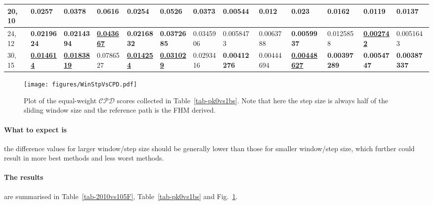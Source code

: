 \begin{table*}
{\begin{tabular}{|l|l|l|l|l|l|l|l|l|l|l|l|l|}
20, 10 & {\color[HTML]{34FF34} \textbf{0.0257}} & 0.0378 & 0.0616 &
  0.0254 & 0.0526 & 0.0373 & 0.00544 & 0.012 &
  0.023 & 0.0162 & {\color[HTML]{34FF34} \textbf{0.0119}} & 0.0137 \\ \hline
24, 12 & {\color[HTML]{32CB00} \textbf{0.0219624}} & {\color[HTML]{32CB00}
  \textbf{0.0214394}} & {\color[HTML]{009901} {\ul \textbf{0.043667}}} &
  {\color[HTML]{32CB00} \textbf{0.0216832}} & {\color[HTML]{32CB00}
  \textbf{0.0372685}} & 0.0345906 & 0.0058473 & 0.0063788 &
  {\color[HTML]{32CB00} \textbf{0.0059937}} & 0.0125858 &
  {\color[HTML]{009901} {\ul \textbf{0.002742}}} & 0.0051643 \\ \hline
30, 15 & {\color[HTML]{009901} {\ul \textbf{0.014614}}} & {\color[HTML]{009901}
  {\ul \textbf{0.0183819}}} & 0.0786527 & {\color[HTML]{009901} {\ul
  \textbf{0.014254}}} & {\color[HTML]{009901} {\ul \textbf{0.031029}}} &
  0.0293416 & {\color[HTML]{34FF34} \textbf{0.00412276}} &
  0.00444694 & {\color[HTML]{009901} {\ul
  \textbf{0.00448627}}} & {\color[HTML]{32CB00} \textbf{0.00397289}} &
  {\color[HTML]{32CB00} \textbf{0.0054747}} & {\color[HTML]{32CB00}
  \textbf{0.00387337}} \\ \hline
\end{tabular}%
}
\end{table*}

\begin{figure}
\centering
\texttt{[image: figures/WinStpVsCPD.pdf]}
\caption[Sliding window and step sizes versus CPD]{Plot of the equal-weight
  $\mathcal{CPD}$ scores collected in Table~\ref{tab-pk0vs1bs}. Note that here
  the step size is always half of the sliding window size and the reference path
  is the FHM derived.}\label{fig-WinStpVsCPD}
\end{figure}

\paragraph{What to expect is}
the difference values for larger window/step size should be generally lower than
those for smaller window/step size, which further could result in more best
methods and less worst methods.

\paragraph{The results}
are summarised in Table~\ref{tab-2010vs105F}, Table~\ref{tab-pk0vs1bs} and
Fig.~\ref{fig-WinStpVsCPD}.

